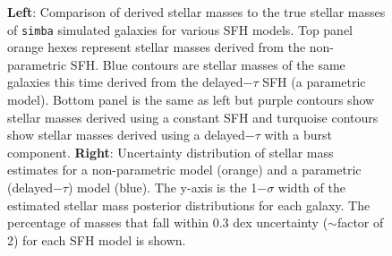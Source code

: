 \documentclass[twocolumn]{aastex62}
\begin{document}
\begin{figure}[!h]
  \centering
  \hfill
  \caption{\textbf{Left}: Comparison of derived stellar masses to the true stellar masses of \texttt{simba} simulated galaxies for various SFH models. Top panel orange hexes represent stellar masses derived from the non-parametric SFH. Blue contours are stellar masses of the same galaxies this time derived from the delayed$-\tau$ SFH (a parametric model). Bottom panel is the same as left but purple contours show stellar masses derived using a constant SFH and turquoise contours show stellar masses derived using a delayed$-\tau$ with a burst component. \textbf{Right}: Uncertainty distribution of stellar mass estimates for a non-parametric model (orange) and a parametric (delayed$-\tau$) model (blue). The y-axis is the 1$-\sigma$ width of the estimated stellar mass posterior distributions for each galaxy. The percentage of masses that fall within 0.3 dex uncertainty ($\sim$factor of 2) for each SFH model is shown.}
\label{fig:mass_comp}
\end{figure}
\end{document}
